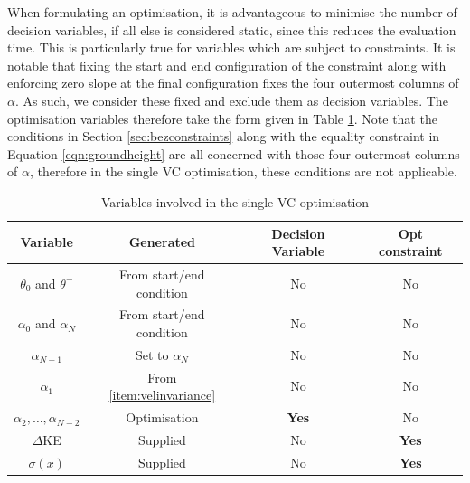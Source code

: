 When formulating an optimisation, it is advantageous to minimise the number of decision variables, if all else is considered static, since this reduces the evaluation time. This is particularly true for variables which are subject to constraints. It is notable that fixing the start and end configuration of the constraint along with enforcing zero slope at the final configuration fixes the four outermost columns of $\alpha$. As such, we consider these fixed and exclude them as decision variables. The optimisation variables therefore take the form given in Table \ref{tab:optDecVars}. Note that the conditions in Section \ref{sec:bezconstraints} along with the equality constraint in Equation \ref{eqn:groundheight} are all concerned with those four outermost columns of $\alpha$, therefore in the single VC optimisation, these conditions are not applicable.

\begin{table}
	\centering
	\begin{tabular}{c | c | c | c}
		            Variable             & Generated                     & Decision Variable & Opt constraint \\ \hline
		   $\theta_0$ and $\theta^-$     & From start/end condition      & No                & No             \\
		   $\alpha_0$ and $\alpha_N$     & From start/end condition      & No                & No             \\
		         $\alpha_{N-1}$          & Set to $\alpha_N$             & No                & No             \\
		           $\alpha_1$            & From \ref{item:velinvariance} & No                & No             \\
		$\alpha_2, \ldots, \alpha_{N-2}$ & Optimisation                  & \textbf{Yes}      & No             \\
		           $\Delta$KE            & Supplied                      & No                & \textbf{Yes}   \\
		          $\sigma(x)$            & Supplied                      & No                & \textbf{Yes}
	\end{tabular}
	\caption{Variables involved in the single VC optimisation}
	\label{tab:optDecVars}
\end{table}

